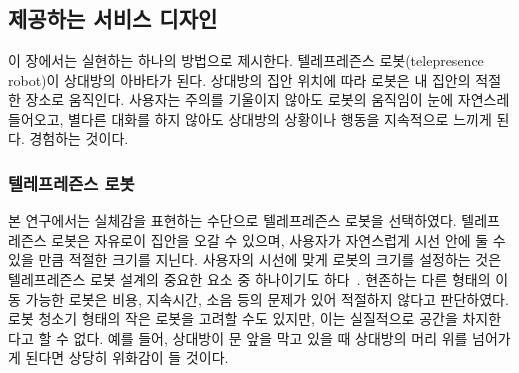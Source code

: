 \chapter{\approach}
\label{sec:system_design}
    
\section{ 제공하는 서비스 디자인}


이 장에서는 \concept\을 실현하는 하나의 방법으로 \approach\를 제시한다. 텔레프레즌스 로봇(telepresence robot)이 상대방의 아바타가 된다. 상대방의 집안 위치에 따라 로봇은 내 집안의 적절한 장소로 움직인다. 사용자는 주의를 기울이지 않아도 로봇의 움직임이 눈에 자연스레 들어오고, 별다른 대화를 하지 않아도 상대방의 상황이나 행동을 지속적으로 느끼게 된다. \concept\을 경험하는 것이다.

\subsection{텔레프레즌스 로봇}


본 연구에서는  실체감을 표현하는 수단으로 텔레프레즌스 로봇을 선택하였다. 텔레프레즌스 로봇은 자유로이 집안을 오갈 수 있으며, 사용자가 자연스럽게 시선 안에 둘 수 있을 만큼 적절한 크기를 지닌다. 사용자의 시선에 맞게 로봇의 크기를 설정하는 것은 텔레프레즌스 로봇 설계의 중요한 요소 중 하나이기도 하다~\cite{desai2011essential}. 현존하는 다른 형태의 이동 가능한 로봇은 비용, 지속시간, 소음 등의 문제가 있어 적절하지 않다고 판단하였다. 로봇 청소기 형태의 작은 로봇을 고려할 수도 있지만, 이는 실질적으로 공간을 차지한다고 할 수 없다. 예를 들어, 상대방이 문 앞을 막고 있을 때 상대방의 머리 위를 넘어가게 된다면 상당히 위화감이 들 것이다.

